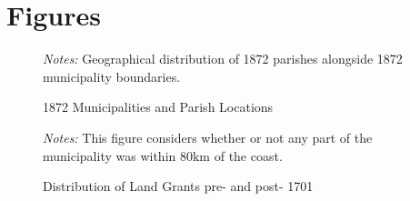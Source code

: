 \documentclass{article}
\begin{document}
\printbibliography

\clearpage

\section*{Figures}

\begin{figure}[h!]
  \caption{1872 Municipalities and Parish Locations}
  \begin{center}
  \textit{Notes:} Geographical distribution of 1872 parishes alongside 1872 municipality boundaries.
  \end{center}
  \label{fig:parishes_1872}
\end{figure}

\begin{figure}
  \caption{Distribution of Land Grants pre- and post- 1701}
  \begin{center}
  \textit{Notes:} This figure considers whether or not any part of the municipality was within 80km of the coast.
  \end{center}
  \label{fig:SesmariasDistribution}
\end{figure}

\clearpage
\end{document}
